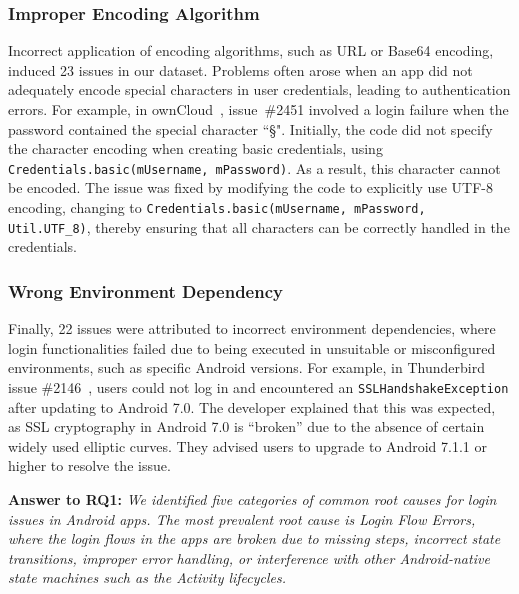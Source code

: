 \subsubsection{Improper Encoding Algorithm}
Incorrect application of encoding algorithms, such as URL or Base64 encoding, induced 23 issues in our dataset. Problems often arose when an app did not adequately encode special characters in user credentials, leading to authentication errors. For example, in ownCloud~\cite{owncloud}, issue~\#2451 involved a login failure when the password contained the special character ``§". Initially, the code did not specify the character encoding when creating basic credentials, using \texttt{Credentials.basic(mUsername, mPassword)}.
As a result, this character cannot be encoded.
The issue was fixed by modifying the code to explicitly use UTF-8 encoding, changing to \texttt{Credentials.basic(mUsername, mPassword, Util.UTF\_8)}, thereby ensuring that all characters can be correctly handled in the credentials.

\subsubsection{Wrong Environment Dependency}
Finally, 22 issues were attributed to incorrect environment dependencies, where login functionalities failed due to being executed in unsuitable or misconfigured environments, such as specific Android versions. For example, in Thunderbird issue \#2146~\cite{thunderbird-android}, users could not log in and encountered an \texttt{SSLHandshakeException} after updating to Android 7.0. The developer explained that this was expected, as SSL cryptography in Android 7.0 is ``broken'' due to the absence of certain widely used elliptic curves. They advised users to upgrade to Android 7.1.1 or higher to resolve the issue.




\begin{tcolorbox}[left=3pt,right=3pt,top=1pt,bottom=1pt]
    \textbf{Answer to RQ1:} 
\textit{We identified five categories of common root causes for login issues in Android apps. The most prevalent root cause is Login Flow Errors, where the login flows in the apps are broken due to missing steps, incorrect state transitions, improper error handling, or interference with other Android-native state machines such as the Activity lifecycles.
}
\end{tcolorbox}
